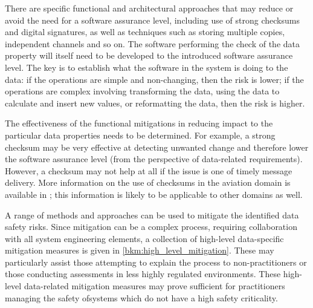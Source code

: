 There are specific functional and architectural approaches that may reduce or avoid the need for a \gls{software assurance level}, including use of strong checksums and digital signatures, as well as techniques such as storing multiple copies, independent channels and so on. The software performing the check of the \gls{data property} will itself need to be developed to the introduced \gls{software assurance level}. The key is to establish what the software in the system is doing to the data: if the operations are simple and non-changing, then the risk is lower; if the operations are complex involving transforming the data, using the data to calculate and insert new values, or reformatting the data, then the risk is higher.

The effectiveness of the functional \glspl{mitigation} in reducing impact to the particular data properties needs to be determined. For example, a strong checksum may be very effective at detecting unwanted change and therefore lower the \gls{software assurance level} (from the perspective of data-related requirements). However, a checksum may not help at all if the issue is one of timely message delivery. More \gls{information} on the use of checksums in the aviation domain is available in \cite{citation:koopman2015selection}; this \gls{information} is likely to be applicable to other domains as well.

A range of methods and approaches can be used to mitigate the identified data safety risks. Since \gls{mitigation} can be a complex process, requiring collaboration with all system engineering elements, a collection of high-level data-specific \gls{mitigation} measures is given in \autoref{bkm:high_level_mitigation}. These may particularly assist those attempting to explain the process to non-practitioners or those conducting assessments in less highly regulated environments. These high-level data-related \gls{mitigation} measures may prove sufficient for practitioners \cbstart managing the safety of\cbend systems which do not have a high safety criticality.

